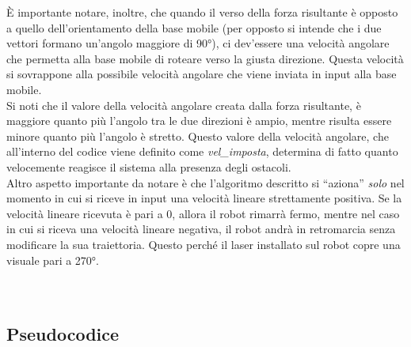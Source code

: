 È importante notare, inoltre, che quando il verso della forza risultante è opposto a quello dell'orientamento della base mobile (per opposto si intende che i due vettori formano un'angolo maggiore di 90°), ci dev'essere una velocità angolare che permetta alla base mobile di roteare verso la giusta direzione. Questa velocità si sovrappone alla possibile velocità angolare che viene inviata in input alla base mobile.\\ 
Si noti che il valore della velocità angolare creata dalla forza risultante, è maggiore quanto più l’angolo tra le due direzioni è ampio, mentre risulta essere minore quanto più l’angolo è stretto. Questo valore della velocità angolare, che all'interno del codice viene definito come \textit{vel\_imposta}, determina di fatto quanto velocemente reagisce il sistema alla presenza degli ostacoli.\\
Altro aspetto importante da notare è che l’algoritmo descritto si ``aziona'' \textit{solo} nel momento in cui si riceve in input una velocità lineare strettamente positiva. Se la velocità lineare ricevuta è pari a 0, allora il robot rimarrà fermo, mentre nel caso in cui si riceva una velocità lineare negativa, il robot andrà in retromarcia senza modificare la sua traiettoria. Questo perché il laser installato sul robot copre una visuale pari a 270°. \\\\\\

\subsection{Pseudocodice}

